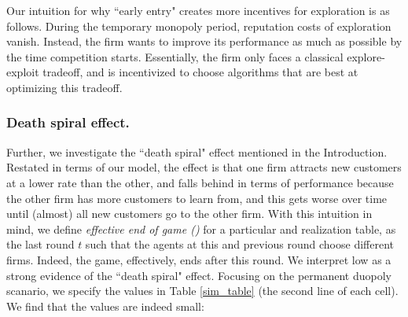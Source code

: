 \documentclass[../competing_bandits.tex]{subfiles}
\begin{document}

Our intuition for why ``early entry" creates more incentives for exploration is as follows. During the temporary monopoly period, reputation costs of exploration vanish. Instead, the firm wants to improve its performance as much as possible by the time competition starts. Essentially, the firm only faces a classical explore-exploit tradeoff, and is incentivized to choose algorithms that are best at optimizing this tradeoff.



\subsubsection{Death spiral effect.}
Further, we investigate the ``death spiral" effect mentioned in the Introduction. Restated in terms of our model, the effect is that one firm attracts new customers at a lower rate than the other, and falls behind in terms of performance because the other firm has more customers to learn from, and this gets worse over time until (almost) all new customers go to the other firm. With this intuition in mind, we define  \textit{effective end of game (\Eeog)} for a particular \MRV and realization table, as the last round $t$ such that the agents at this and previous round choose different firms. Indeed, the game, effectively, ends after this round. We interpret low \Eeog as a strong evidence of the ``death spiral" effect. Focusing on the permanent duopoly scanario, we specify the \Eeog values in Table \ref{sim_table} (the second line of each cell). We find that the \Eeog values are indeed small:
\end{document}
